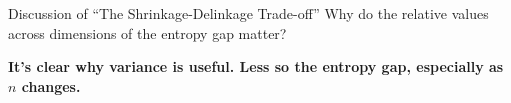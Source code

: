 \documentclass[8pt]{beamer}\usepackage[]{graphicx}\usepackage[]{color}
\begin{document}
\begin{frame}{Discussion of ``The Shrinkage-Delinkage Trade-off''}
\pause
Why do the relative values across dimensions of the entropy gap matter?

\textbf{It's clear why variance is useful.  Less so the entropy gap,
especially as $n$ changes.}




\end{frame}




    
%     
%     
    
\end{document}
